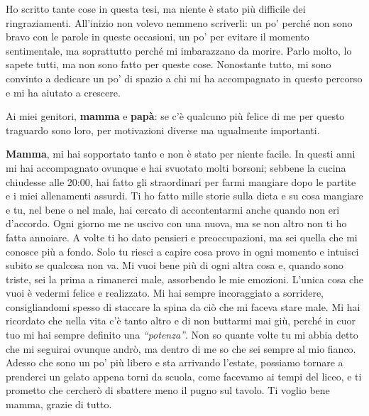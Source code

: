 
Ho scritto tante cose in questa tesi, ma niente è stato più difficile dei ringraziamenti. All'inizio non volevo nemmeno scriverli: un po' perché non sono bravo con le parole in queste occasioni, un po' per evitare il momento sentimentale, ma soprattutto perché mi imbarazzano da morire. Parlo molto, lo sapete tutti, ma non sono fatto per queste cose. Nonostante tutto, mi sono convinto a dedicare un po' di spazio a chi mi ha accompagnato in questo percorso e mi ha aiutato a crescere.

Ai miei genitori, \textbf{mamma} e \textbf{papà}: se c'è qualcuno più felice di me per questo traguardo sono loro, per motivazioni diverse ma ugualmente importanti.

\textbf{Mamma}, mi hai sopportato tanto e non è stato per niente facile. In questi anni mi hai accompagnato ovunque e hai svuotato molti borsoni; sebbene la cucina chiudesse alle 20:00, hai fatto gli straordinari per farmi mangiare dopo le partite e i miei allenamenti assurdi. Ti ho fatto mille storie sulla dieta e su cosa mangiare e tu, nel bene o nel male, hai cercato di accontentarmi anche quando non eri d'accordo. Ogni giorno me ne uscivo con una nuova, ma se non altro non ti ho fatta annoiare. A volte ti ho dato pensieri e preoccupazioni, ma sei quella che mi conosce più a fondo. Solo tu riesci a capire cosa provo in ogni momento e intuisci subito se qualcosa non va. Mi vuoi bene più di ogni altra cosa e, quando sono triste, sei la prima a rimanerci male, assorbendo le mie emozioni. L'unica cosa che vuoi è vedermi felice e realizzato. Mi hai sempre incoraggiato a sorridere, consigliandomi spesso di staccare la spina da ciò che mi faceva stare male. Mi hai ricordato che nella vita c'è tanto altro e di non buttarmi mai giù, perché in cuor tuo mi hai sempre definito una \textit{“potenza”}. Non so quante volte tu mi abbia detto che mi seguirai ovunque andrò, ma dentro di me so che sei sempre al mio fianco. Adesso che sono un po' più libero e sta arrivando l'estate, possiamo tornare a prenderci un gelato appena torni da scuola, come facevamo ai tempi del liceo, e ti prometto che cercherò di sbattere meno il pugno sul tavolo. Ti voglio bene mamma, grazie di tutto.

